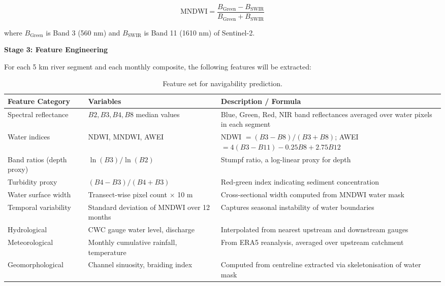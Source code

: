\documentclass[12pt,a4paper]{article}
\begin{document}
\begin{equation}
\text{MNDWI} = \frac{B_{\text{Green}} - B_{\text{SWIR}}}{B_{\text{Green}} + B_{\text{SWIR}}}
\label{eq:mndwi}
\end{equation}

where $B_{\text{Green}}$ is Band 3 (560 nm) and $B_{\text{SWIR}}$ is Band 11 (1610 nm) of Sentinel-2.

\vspace{0.4cm}
\noindent\textbf{Stage 3: Feature Engineering}

For each 5 km river segment and each monthly composite, the following features will be extracted:

\begin{table}[H]
\centering
\caption{Feature set for navigability prediction.}
\label{tab:features}
\begin{tabular}{p{3.5cm} p{4cm} p{5cm}}
\toprule
\textbf{Feature Category} & \textbf{Variables} & \textbf{Description / Formula} \\
\midrule
Spectral reflectance & $B2, B3, B4, B8$ median values & Blue, Green, Red, NIR band reflectances averaged over water pixels in each segment \\
\addlinespace
Water indices & NDWI, MNDWI, AWEI & NDWI $= (B3 - B8)/(B3 + B8)$; AWEI $= 4(B3 - B11) - 0.25 B8 + 2.75 B12$ \\
\addlinespace
Band ratios (depth proxy) & $\ln(B3)/\ln(B2)$ & Stumpf ratio, a log-linear proxy for depth \\
\addlinespace
Turbidity proxy & $(B4 - B3)/(B4 + B3)$ & Red-green index indicating sediment concentration \\
\addlinespace
Water surface width & Transect-wise pixel count $\times$ 10 m & Cross-sectional width computed from MNDWI water mask \\
\addlinespace
Temporal variability & Standard deviation of MNDWI over 12 months & Captures seasonal instability of water boundaries \\
\addlinespace
Hydrological & CWC gauge water level, discharge & Interpolated from nearest upstream and downstream gauges \\
\addlinespace
Meteorological & Monthly cumulative rainfall, temperature & From ERA5 reanalysis, averaged over upstream catchment \\
\addlinespace
Geomorphological & Channel sinuosity, braiding index & Computed from centreline extracted via skeletonisation of water mask \\
\bottomrule
\end{tabular}
\end{table}
\end{document}
